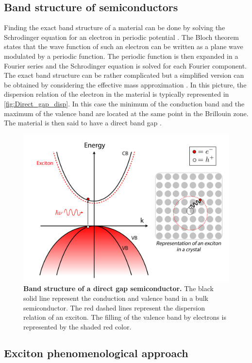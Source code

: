 \subsection{Band structure of semiconductors}

Finding the exact band structure of a material can be done by solving the Schrodinger equation for an electron in periodic potential \cite{weisbuch_microcavities_1996}.
 The Bloch theorem states that the wave function of such an electron can be written as a plane wave modulated by a periodic function. The periodic function is then expanded in a Fourier series and the Schrodinger equation is solved for each Fourier component. 
 The exact band structure can be rather complicated but a simplified version can be obtained by considering the effective mass approximation \cite{kittel_introduction_2005}. In this picture, the dispersion relation of the electron in the material is typically represented in \autoref{fig:Direct_gap_disp}.
In this case the minimum of the conduction band and the maximum of the valence band are located at the same point in the Brillouin zone. The material is then said to have a direct band gap \cite{weisbuch_microcavities_1996}.
\begin{figure}[h]
    \centering
    \includegraphics[width=0.8\linewidth]{chap_theory/fig/DirectGapDisp.png}
    \caption{\textbf{Band structure of a direct gap semiconductor.} The black solid line represent the conduction and valence band in a bulk semiconductor. The red dashed lines represent the dispersion relation of an exciton. The filling of the valence band by electrons is represented by the shaded red color.}
    \label{fig:Direct_gap_disp}
\end{figure}


\subsection{Exciton phenomenological approach}

